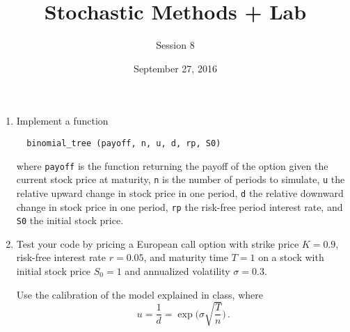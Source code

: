 \documentclass[12pt]{article}
\begin{document}
\title{Stochastic Methods + Lab}
\author{Session 8}
\date{September 27, 2016}
\maketitle

\begin{enumerate}
\item Implement a function
\begin{verbatim}
  binomial_tree (payoff, n, u, d, rp, S0)
\end{verbatim}
where \verb+payoff+ is the function returning the payoff of the option
given the current stock price at maturity, \verb+n+ is the number of
periods to simulate, \verb+u+ the relative upward change in stock
price in one period, \verb+d+ the relative downward change in stock
price in one period, \verb+rp+ the risk-free period interest rate, and
\verb+S0+ the initial stock price.

\item Test your code by pricing a European call option with strike
price $K=0.9$, risk-free interest rate $r=0.05$, and maturity time
$T=1$ on a stock with initial stock price $S_0=1$ and annualized
volatility $\sigma=0.3$.

Use the calibration of the model explained in class, where
\[
  u = \frac1d = \exp \biggl( \sigma \sqrt{\frac{T}n} \biggr) \,.
\]

\end{enumerate}
\end{document}
